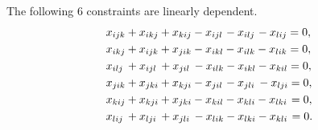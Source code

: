 \begin{lemma} \label{lem6}
	The following 6 constraints are linearly dependent.
	\begin{align}
	&x_{ijk} + x_{ikj} + x_{kij} - x_{ijl} \hspace{1 pt}- x_{ilj} \hspace{1 pt}- x_{lij} = 0, \label{s1} \\
	&x_{ikj} + x_{ijk} + x_{jik} - x_{ikl} - x_{ilk} - x_{lik} = 0, \label{s2} \\
	&x_{ilj} \hspace{2 pt}+ x_{ijl} \hspace{2 pt}+ x_{jil}\hspace{2 pt} - x_{ilk} - x_{ikl} - x_{kil} = 0, \label{s3} \\
	&x_{jik} + x_{jki} + x_{kji} - x_{jil} \hspace{1 pt}- x_{jli} \hspace{2 pt}- x_{lji} = 0, \label{s4} \\
	&x_{kij} + x_{kji} + x_{jki} - x_{kil} - x_{kli} - x_{lki} \hspace{1 pt}= 0, \label{s5} \\
	&x_{lij} \hspace{2 pt}+ x_{lji} \hspace{2 pt}+ x_{jli} \hspace{2 pt}- x_{lik} - x_{lki} - x_{kli} \hspace{1 pt}= 0. \label{s6}
	\end{align}
\end{lemma}


